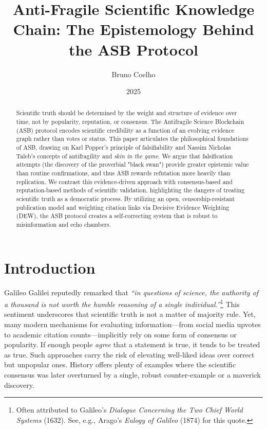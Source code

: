 \documentclass{article}
\title{Anti-Fragile Scientific Knowledge Chain: The Epistemology Behind the ASB Protocol}
\author{Bruno Coelho}
\date{2025}
\begin{document}
\maketitle

\begin{abstract}
Scientific truth should be determined by the weight and structure of evidence over time, not by popularity, reputation, or consensus. The Antifragile Science Blockchain (ASB) protocol encodes scientific credibility as a function of an evolving evidence graph rather than votes or status. This paper articulates the philosophical foundations of ASB, drawing on Karl Popper's principle of falsifiability and Nassim Nicholas Taleb's concepts of antifragility and \emph{skin in the game}. We argue that falsification attempts (the discovery of the proverbial "black swan") provide greater epistemic value than routine confirmations, and thus ASB rewards refutation more heavily than replication. We contrast this evidence-driven approach with consensus-based and reputation-based methods of scientific validation, highlighting the dangers of treating scientific truth as a democratic process. By utilizing an open, censorship-resistant publication model and weighting citation links via Decisive Evidence Weighting (DEW), the ASB protocol creates a self-correcting system that is robust to misinformation and echo chambers. 
\end{abstract}

\section{Introduction}
Galileo Galilei reputedly remarked that \emph{``in questions of science, the authority of a thousand is not worth the humble reasoning of a single individual.''}\footnote{Often attributed to Galileo's \emph{Dialogue Concerning the Two Chief World Systems} (1632). See, e.g., Arago's \emph{Eulogy of Galileo} (1874) for this quote.} This sentiment underscores that scientific truth is not a matter of majority rule. Yet, many modern mechanisms for evaluating information---from social media upvotes to academic citation counts---implicitly rely on some form of consensus or popularity. If enough people \emph{agree} that a statement is true, it tends to be treated as true. Such approaches carry the risk of elevating well-liked ideas over correct but unpopular ones. History offers plenty of examples where the scientific consensus was later overturned by a single, robust counter-example or a maverick discovery.
\end{document}
